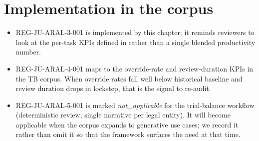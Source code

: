 \section{Implementation in the corpus}

\begin{itemize}
  \item REG-JU-ARAL-3-001 is implemented by this chapter; it reminds
        reviewers to look at the per-task KPIs defined in
         rather than a single
        blended productivity number.
  \item REG-JU-ARAL-4-001 maps to the override-rate and review-duration
        KPIs in the TB corpus. When override rates fall well below
        historical baseline and review duration drops in lockstep, that
        is the signal to re-audit.
  \item REG-JU-ARAL-5-001 is marked \emph{not\_applicable} for the
        trial-balance workflow (deterministic review, single narrative
        per legal entity). It will become applicable when the corpus
        expands to generative use cases; we record it rather than omit it
        so that the framework surfaces the need at that time.
\end{itemize}
\clearpage
